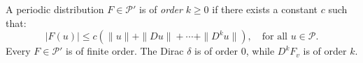 A periodic distribution $F \in \mathcal{P}'$ is of \textit{order} $k \geq 0$ if there exists a constant $c$ such that:
\[
|F(u)| \leq c \left( \|u\| + \|Du\| + \cdots + \|D^k u\| \right), \quad \text{for all } u \in \mathcal{P}.
\]
Every $F \in \mathcal{P}'$ is of finite order. The Dirac $\delta$ is of order $0$, while $D^k F_v$ is of order $k$.
